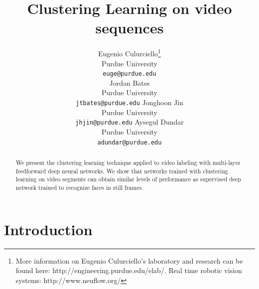 \documentclass{article} %
\begin{document}
\title{Clustering Learning on video sequences}

\author{
Eugenio Culurciello\thanks{More information on Eugenio Culurciello's laboratory and research can be found here: http://engineering.purdue.edu/elab/. Real time robotic vision systems: http://www.neuflow.org/} \\
Purdue University\\
\texttt{euge@purdue.edu} \\
\And
Jordan Bates \\
Purdue University\\
\texttt{jtbates@purdue.edu}
\AND
Jonghoon Jin \\
Purdue University\\
\texttt{jhjin@purdue.edu}
\AND
Aysegul Dundar \\
Purdue University\\
\texttt{adundar@purdue.edu}
}


\maketitle

\begin{abstract}
We present the clustering learning technique applied to video labeling with multi-layer feedforward deep neural networks. We show that networks trained with clustering learning on video segments can obtain similar levels of performance as supervised deep network trained to recognize faces in still frames. 
\end{abstract}


\section{Introduction}
\end{document}
